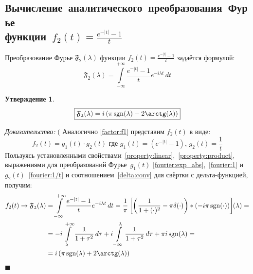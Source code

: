\documentclass[11pt, oneside, draft]{article}
\numberwithin{equation}{section}
\newtheorem*{statement}{Утверждение}
\renewenvironment{proof}{
\noindent\textit{Доказательство: }} {\qed}
\newcommand \rarrow{\rightarrow}
\newcommand \intinf[1][{\,dt}]{ \int\limits_{-\infty}^{+\infty}{{#1}}}
\renewcommand \qed{$\blacksquare$}
\DeclareMathOperator{\sgn}{sgn}
\begin{document}
    \subsection{Вычисление~аналитического~преобразования~Фурье\\функции~\(f_2(t) = \frac{e^{-|t|} - 1}{t} \)} Преобразование Фурье \( \mathfrak{F_2} (\lambda)\) функции \(f_2(t) = \frac{e^{-|t|} - 1}{t} \) задаётся формулой:
    \[ \mathfrak{F_2} (\lambda) = \intinf[{\dfrac{e^{-|t|} - 1}{t} e^{-i\lambda t}\, dt}] \]
    \begin{statement}
        \begin{equation}\label{fourier_transform:f2} 
            \boxed{ \mathfrak{F_2}(\lambda) = i\left(\pi\sgn(\lambda) - 2\arctg(\lambda)\right) } 
        \end{equation}
    \end{statement}
    \begin{proof}(
        Аналогично \eqref{factor:f1} представим \(f_2(t) \) в виде: 
        \begin{equation}\label{factor:f2} 
            f_2(t) = g_1(t) \cdot g_2(t) \text{ где } g_1(t) = \left(e^{-|t|} - 1\right)\text{, } g_2(t) = \dfrac{1}{t} 
        \end{equation}
        Пользуясь установленными свойствами~\ref{property:linear},~\ref{property:product}, выражениями для преобразований Фурье~\(g_1(t)\) \eqref{fourier:exp_abs},~\eqref{fourier:1} и~\(g_2(t)\)~\eqref{fourier:1/t} и соотношением~\eqref{delta:conv} для свёртки с дельта-функцией, получим:
        \[ 
        \begin{split} 
            f_2(t) \rarrow \mathfrak{F_2} (\lambda) &= \intinf[{ \dfrac{e^{-|t|} - 1}{t} e^{-i\lambda t}\, dt}] = \dfrac{1}{\pi}\left[\left({\dfrac{1}{1 + (\cdot)^2} - \pi\delta(\cdot)}\right) * \left({-i \pi \sgn(\cdot)}\right)\right] \negmedspace({\lambda}) = \\
            &= -i\int\limits_{\lambda}^{+\infty}{\dfrac{1}{1 + \tau^2}\, d\tau} + i\int\limits_{-\infty}^{\lambda}{\dfrac{1}{1 + \tau^2}\, d\tau} + \pi i \sgn(\lambda) = \\
            &= i\left(\pi \sgn(\lambda) + 2\arctg(\lambda)\right) 
        \end{split}
        \]
    \end{proof}
    \clearpage
    \appendix
\end{document}
